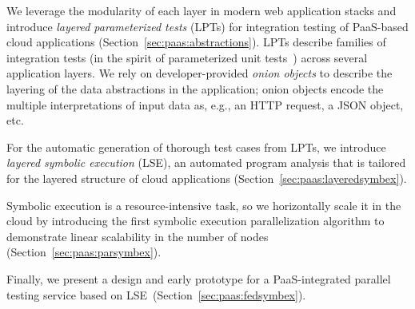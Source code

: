 We leverage the modularity of each layer in modern web application stacks and introduce \textit{layered parameterized tests} (LPTs) for integration testing of PaaS-based cloud applications (Section~\ref{sec:paas:abstractions}).
%
LPTs describe families of integration tests (in the spirit of parameterized unit tests~\cite{tillmann-puts}) across several application layers. We rely on developer-provided \textit{onion objects} to describe the layering of the data abstractions in the application; onion objects encode the multiple interpretations of input data as, e.g., an HTTP request, a JSON object, etc.

For the automatic generation of thorough test cases from LPTs, we introduce \emph{layered symbolic execution} (LSE), an automated program analysis that is tailored for the layered structure of cloud applications (Section~\ref{sec:paas:layeredsymbex}).

Symbolic execution is a resource-intensive task, so we horizontally scale it in the cloud by introducing the first symbolic execution parallelization algorithm to demonstrate linear scalability in the number of nodes (Section~\ref{sec:paas:parsymbex}).

Finally, we present a design and early prototype for a PaaS-integrated parallel testing service based on LSE~(Section~\ref{sec:paas:fedsymbex}).

